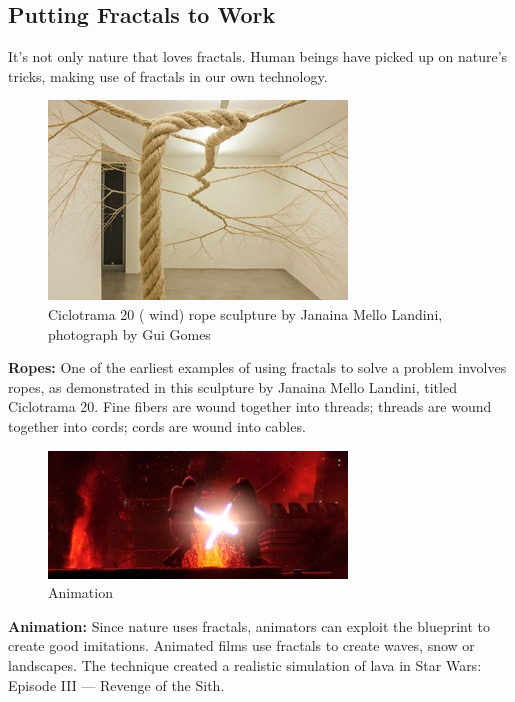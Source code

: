 \documentclass{article}
\begin{document}
\begin{itemize}
\section{Putting Fractals to Work}
It’s not only nature that loves fractals. Human beings have picked up on nature’s tricks, making use of fractals in our own technology.
\begin{figure}[H]
\centering
\includegraphics[scale=1.3]{DSC-B0818_14.jpg}
\caption{Ciclotrama 20 ( wind) rope sculpture by Janaina Mello Landini, photograph by Gui Gomes}
\end{figure}

\textbf{Ropes:} One of the earliest examples of using fractals to solve a problem involves ropes, as demonstrated in this sculpture by Janaina Mello Landini, titled Ciclotrama 20. Fine fibers are wound together into threads; threads are wound together into cords; cords are wound into cables.
\begin{figure}[H]
\centering
\includegraphics[scale=1.3]{DSC-B0818_15.jpg}
\caption{Animation}
\end{figure}

\textbf{Animation:} Since nature uses fractals, animators can exploit the blueprint to create good imitations. Animated films use fractals to create waves, snow or landscapes. The technique created a realistic simulation of lava in Star Wars: Episode III — Revenge of the Sith. 


\end{itemize}
\end{document}
